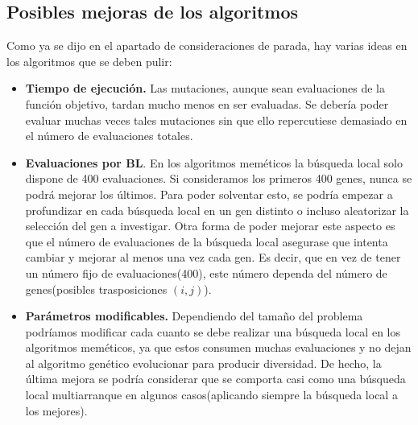 \subsection{Posibles mejoras de los algoritmos}

Como ya se dijo en el apartado de consideraciones de parada, hay varias ideas en los algoritmos que se deben pulir:\\

\begin{itemize}
	\item \textbf{Tiempo de ejecución.} Las mutaciones, aunque sean evaluaciones de la función objetivo, tardan mucho menos en ser evaluadas. Se debería poder evaluar muchas veces tales mutaciones sin que ello repercutiese demasiado en el número de evaluaciones totales.
	
	\item \textbf{Evaluaciones por BL}. En los algoritmos meméticos la búsqueda local solo dispone de 400 evaluaciones. Si consideramos los primeros 400 genes, nunca se podrá mejorar los últimos. Para poder solventar esto, se podría empezar a profundizar en cada búsqueda local en un gen distinto o incluso aleatorizar la selección del gen a investigar. Otra forma de poder mejorar este aspecto es que el número de evaluaciones de la búsqueda local asegurase que intenta cambiar y mejorar al menos una vez cada gen. Es decir, que en vez de tener un número fijo de evaluaciones(400), este número dependa del número de genes(posibles trasposiciones $(i,j)$).
	
	\item \textbf{Parámetros modificables.} Dependiendo del tamaño del problema podríamos modificar cada cuanto se debe realizar una búsqueda local en los algoritmos meméticos, ya que estos consumen muchas evaluaciones y no dejan al algoritmo genético evolucionar para producir diversidad. De hecho, la última mejora se podría considerar que se comporta casi como una búsqueda local multiarranque en algunos casos(aplicando siempre la búsqueda local a los mejores).
	
\end{itemize}














